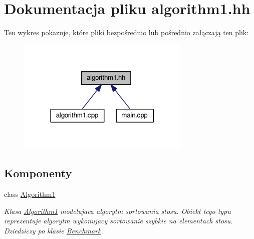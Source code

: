 \hypertarget{algorithm1_8hh}{\section{Dokumentacja pliku algorithm1.\-hh}
\label{algorithm1_8hh}
}
Ten wykres pokazuje, które pliki bezpośrednio lub pośrednio załączają ten plik\-:\nopagebreak
\begin{figure}[H]
\begin{center}
\leavevmode
\includegraphics[width=234pt]{algorithm1_8hh__dep__incl}
\end{center}
\end{figure}
\subsection*{Komponenty}
\begin{DoxyCompactItemize}
\item 
class \hyperlink{class_algorithm1}{Algorithm1}
\begin{DoxyCompactList}\small\item\em Klasa \hyperlink{class_algorithm1}{Algorithm1} modelujaca algorytm sortowania stosu. Obiekt tego typu reprezentuje algorytm wykonujacy sortowanie szybkie na elementach stosu. Dziedziczy po klasie \hyperlink{class_benchmark}{Benchmark}. \end{DoxyCompactList}\end{DoxyCompactItemize}

